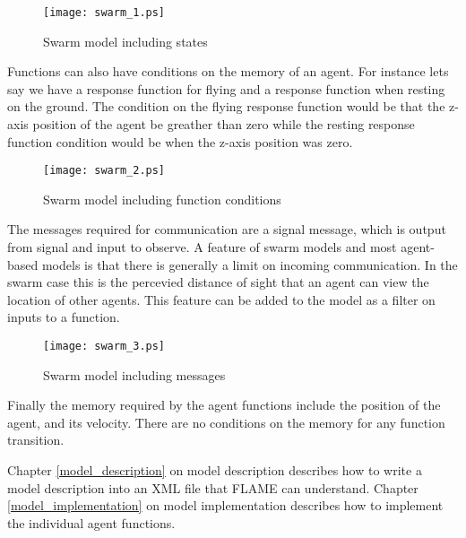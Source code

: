 \begin{figure}[h]
\begin{center}
\texttt{[image: swarm\_1.ps]}
\caption{Swarm model including states}
\label{fig:swarm_1}
\end{center}
\end{figure}

Functions can also have conditions on the memory of an agent. For instance lets
say we have a response function for flying and a response function when resting
on the ground. The condition on the flying response function would be that the
z-axis position of the agent be greather than zero while the resting response
function condition would be when the z-axis position was zero.

\begin{figure}[h]
\begin{center}
\texttt{[image: swarm\_2.ps]}
\caption{Swarm model including function conditions}
\label{fig:swarm_2}
\end{center}
\end{figure}

The messages required for communication are a signal message, which is output
from signal and input to observe. A feature of swarm models and most
agent-based models is that there is generally a limit on incoming
communication. In the swarm case this is the percevied distance of sight that
an agent can view the location of other agents. This feature can be added to
the model as a filter on inputs to a function.

\begin{figure}[h]
\begin{center}
\texttt{[image: swarm\_3.ps]}
\caption{Swarm model including messages}
\label{fig:swarm_3}
\end{center}
\end{figure}

Finally the memory required by the agent functions include the position of the
agent, and its velocity. There are no conditions on the memory for any function
transition.

Chapter \ref{model_description} on model description describes how to write a
model description into an XML file that FLAME can understand. Chapter
\ref{model_implementation} on model implementation describes how to implement
the individual agent functions. 

